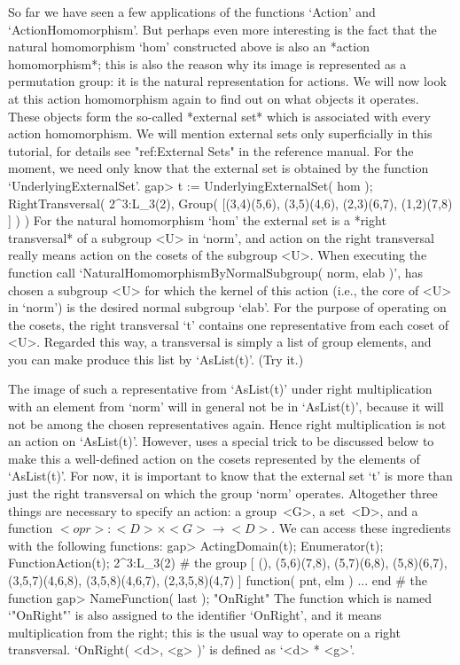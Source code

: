 So far we have seen  a few applications  of the functions `Action' and
`ActionHomomorphism'. But perhaps even  more  interesting is the  fact
that  the  natural  homomorphism `hom'   constructed  above  is  also  an
*action  homomorphism*;  this  is also  the  reason  why its image  is
represented as a permutation group:  it is the natural representation for
actions. We will now look at this action homomorphism again to find
out on what   objects it  operates.  These  objects  form the   so-called
*external set* which is  associated with every action homomorphism. We
will  mention  external sets  only   superficially in this  tutorial, for
details see "ref:External Sets" in the  reference manual. For the moment,
we need   only know that   the external set is  obtained  by the function
`UnderlyingExternalSet'.
\beginexample
gap> t := UnderlyingExternalSet( hom );
RightTransversal( 2^3:L_3(2), Group( [(3,4)(5,6), (3,5)(4,6),
  (2,3)(6,7), (1,2)(7,8) ] ) )
\endexample
{}%
For  the   natural homomorphism   `hom' the  external   set  is a  *right
transversal* of a subgroup  <U>   in `norm',  and   action on the   right
transversal really means action  on the cosets  of the subgroup <U>. When
executing  the function  call `NaturalHomomorphismByNormalSubgroup( norm,
elab )', {\GAP} has  chosen a subgroup  <U> for which  the kernel of this
action (i.e., the core of  <U> in `norm')  is the desired normal subgroup
`elab'. For the purpose of operating on the cosets, the right transversal
`t' contains  one representative  from each coset  of <U>.  Regarded this
way, a transversal  is simply a list of  group elements, and you can make
{\GAP} produce this list by `AsList(t)'. (Try it.)

The  image of  such   a   representative from  `AsList(t)' under    right
multiplication with an  element  from `norm'  will in general  not be  in
`AsList(t)',  because it will   not  be among the  chosen representatives
again.   Hence right multiplication is not   an action on `AsList(t)'.
However, {\GAP} uses a special trick to be discussed below to make this a
well-defined  action  on the  cosets   represented by the  elements of
`AsList(t)'. For now, it is important  to know that  the external set `t'
is   more  than just the  right  transversal  on  which  the group `norm'
operates. Altogether three things  are necessary to specify an action:
a  group~<G>, a  set~<D>, and a   function $<opr>\colon <D>\times  <G>\to
<D>$. We can access these ingredients with the following functions:
\beginexample
gap> ActingDomain(t); Enumerator(t); FunctionAction(t);
2^3:L_3(2)  # the group
[ (), (5,6)(7,8), (5,7)(6,8), (5,8)(6,7), (3,5,7)(4,6,8), (3,5,8)(4,6,7), 
  (2,3,5,8)(4,7) ]
function( pnt, elm ) ... end  # the function
gap> NameFunction( last );
"OnRight"
\endexample
The function  which   is  named  `"OnRight"'  is  also   assigned to  the
identifier `OnRight', and it means multiplication from the right; this is
the usual way to operate on a right transversal. `OnRight( <d>, <g> )' is
defined as `<d> * <g>'.

